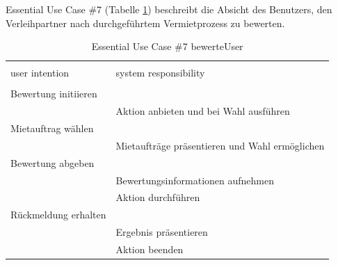 \newpage
Essential Use Case \#7 (Tabelle \ref{tab:bewertung}) beschreibt die Absicht des Benutzers, den Verleihpartner nach durchgeführtem Vermietprozess zu bewerten.
\begin{table}[H]
\caption{Essential Use Case \#7 bewerteUser }
\centering
\begin{tabular}{l l}
\\ [-0.5ex]

\hline\hline
\\ [-0.5ex]
user intention & system responsibility
\\ [1.5ex]
\hline
\\ [-0.5ex]
Bewertung initiieren    &                                 \\[1ex]
                     & Aktion anbieten und bei Wahl ausführen   \\[1ex]
Mietauftrag wählen         &                                 \\[1ex] 
                     & Mietaufträge präsentieren und Wahl ermöglichen \\[1ex]
Bewertung abgeben          &                                 \\[1ex]
                     & Bewertungsinformationen aufnehmen        \\[1ex]
                     & Aktion durchführen                 \\[1ex]
Rückmeldung erhalten    &                                 \\[1ex]
                     & Ergebnis präsentieren                    \\[1ex]
                     & Aktion beenden                     \\[1ex]

\hline
\end{tabular}
\label{tab:bewertung}
\end{table}


